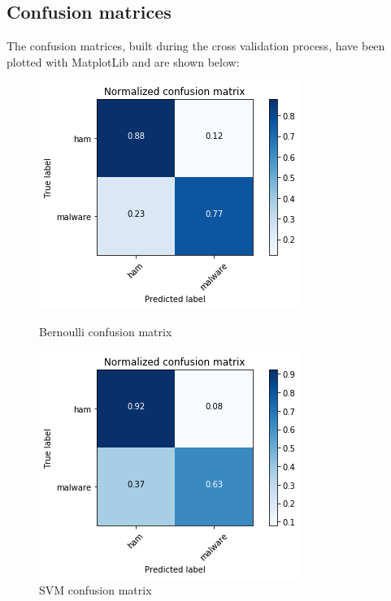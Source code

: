 \documentclass[12pt]{article}
\begin{document}
\subsection{Confusion matrices}
The confusion matrices, built during the cross validation process, have been plotted with MatplotLib and are shown below:
\begin{figure}[!ht]
	\centering
	\begin{minipage}{.5\textwidth}
		\centering
		\includegraphics[width=.8\linewidth]{cnf_m_bernoulli.png}
		\caption{Bernoulli confusion matrix} %
		\label{fig:cnf_m_bernoulli}
	\end{minipage}%
	\begin{minipage}{.5\textwidth}
		\centering
		\includegraphics[width=.8\linewidth]{cnf_m_svm.png}
		\caption{SVM confusion matrix} %
		\label{fig:cnf_m_svm}
	\end{minipage}
\end{figure}
\end{document}
